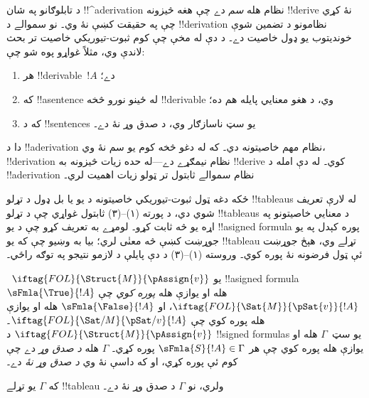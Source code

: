 \documentclass[../../../include/open-logic-section]{subfiles}
\begin{document}
      {}
      {}
      

\begin{explain}
د تابلوګانو په شان !!^a{derivation} نظام هله \emph{سم} دے چې
هغه څيزونه !!{derive} نۀ کړي چې په حقيقت کښې نۀ وي۔ نو سموالے د
!!{derivation} نظامونو د تضمين شوې خونديتوب يو ډول خاصيت دے۔
د دې له مخې چې کوم ثبوت-تيوريکي خاصيت تر بحث لاندې وي، مثلاً غواړو
پوه شو چې:
\begin{enumerate}
\item هر !!{derivable}~$!A$  دے؛
\item که !!a{sentence} له ځينو نورو څخه !!{derivable} وي، د هغو
  معنايي پايله هم ده؛
\item که د !!{sentence}s يو سټ ناسازګار وي، د صدق وړ نۀ دے۔
\end{enumerate}
دا د !!a{derivation} نظام مهم خاصيتونه دي۔ که له دغو څخه کوم يو
سم نۀ وي، !!{derivation} نظام نيمګړے دے---له حده زيات څيزونه به
!!{derive} کوي۔ له دې امله د !!a{derivation} نظام سموالے ثابتول
تر ټولو زيات اهميت لري۔

ځکه دغه ټول ثبوت-تيوريکي خاصيتونه د يو يا بل ډول د تړلو
!!{tableau}s له لارې تعريف شوي دي، د پورته (۱)--(۳) ثابتول غواړي
چې د تړلو !!{tableau}s د معنايي خاصيتونو په اړه يو څه ثابت کړو۔
لومړے به تعريف کړو چې د يو !!a{signed
  formula} پوره کېدل په يو
جوړښت کښې څه معنٰی لري؛ بيا به وښيو چې که يو !!{tableau} تړلے وي،
هېڅ جوړښت ئې ټول فرضونه نۀ پوره کوي۔ وروسته (۱)--(۳) د دې پايلې
د لازمو نتيجو په توګه راځي۔
\end{explain}

\begin{defn}
~$\iftag{FOL}{\Struct{M}}{\pAssign{v}}$
يو !!a{signed formula}~$\sFmla{\True}{!A}$ هله او يوازې هله
\emph{پوره کوي} چې $\iftag{FOL}{\Sat{M}}{\pSat{v}}{!A}$، او
$\sFmla{\False}{!A}$ هله او يوازې هله پوره کوي چې
$\iftag{FOL}{\Sat/{M}}{\pSat/{v}}{!A}$۔
$\iftag{FOL}{\Struct{M}}{\pAssign{v}}$ د !!{signed formula}s يو
سټ~$\Gamma$ هله او يوازې هله پوره کوي چې هر
$\sFmla{S}{!A} \in \Gamma$ پوره کړي۔ $\Gamma$ هله \emph{د صدق وړ}
دے چې کوم  ئې پوره کړي،
او که داسې نۀ وي \emph{د صدق وړ نۀ} دے۔
\end{defn}

\begin{thm}[سموالے]
  که $\Gamma$ يو تړلے !!{tableau} ولري، نو $\Gamma$ د صدق وړ نۀ دے۔
\end{thm}
\end{document}
